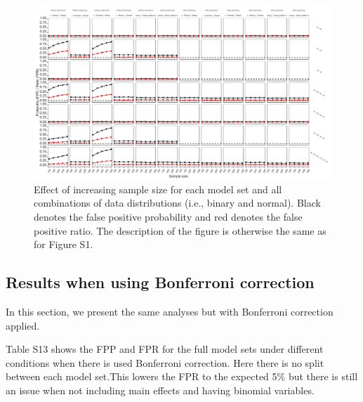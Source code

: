 \begin{landscape}
\begin{figure}[hbt!]
\includegraphics[scale=0.75]{R/Analysis/Result/Figures/Figure1DSI.jpeg}
\centering
\caption{Effect of increasing sample size for each model set and all combinations of data distributions (i.e., binary and normal). Black denotes the false positive probability and red denotes the false positive ratio. The description of the figure is otherwise the same as for Figure S1.}
\label{fig:mainfigure}
\end{figure}
\end{landscape}

\clearpage
\subsection{Results when using Bonferroni correction}

In this section, we present the same analyses but with Bonferroni correction applied. 

Table S13 shows the FPP and FPR for the full model sets under different conditions when there is used Bonferroni correction. Here there is no split between each model set.This lowers the FPR to the expected 5\% but there is still an issue when not including main effects and having binomial variables. 





